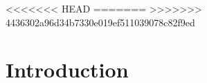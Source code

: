 %
%
<<<<<<< HEAD
\glsresetall
=======
\acresetall
>>>>>>> 4436302a96d34b7330e019ef511039078c82f9ed
\graphicspath{{./chapters/chapter01/fig01/}}

\let\textcircled=\pgftextcircled
\chapter{Introduction}
\label{chap:intro}


